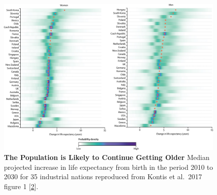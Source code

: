 \documentclass[
]{book}
\begin{document}
\begin{figure}

{\centering \includegraphics[width=0.95\linewidth]{figs/Kontis2017_fig1} 

}

\caption{\textbf{The Population is Likely to Continue Getting Older} Median projected increase in life expectancy from birth in the period 2010 to 2030 for 35 industrial nations reproduced from Kontis et al.~2017 figure 1 {[}\protect\hyperlink{ref-Kontis2017}{2}{]}.}\label{fig:Kontis2017-fig1}
\end{figure}
\end{document}
